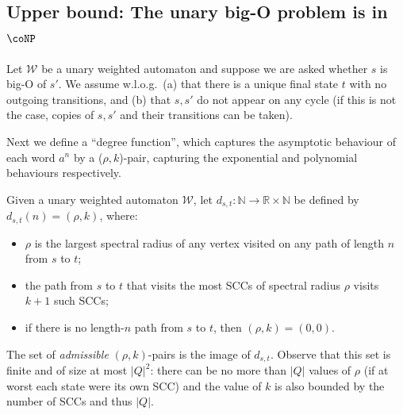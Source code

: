 \documentclass{lmcs}
\theoremstyle{plain}
\theoremstyle{definition}
\theoremstyle{remark}
\newcommand\dgf{d}
\newcommand\wa{\mathcal{W}}
\begin{document}
\subsection{Upper bound: The unary big-O problem is in \texorpdfstring{$\coNP$}{coNP}}
\label{sec:conpsec:upperbound}
Let $\wa$ be a unary weighted automaton and suppose we are asked whether $s$ is big-O of $s'$. We assume  w.l.o.g.\label{conp-ub-assumptions}~(a) that there is a unique final state $t$ with no outgoing transitions, and (b) that $s,s'$ do not appear on any cycle (if this is not the case, copies of $s,s'$ and their transitions can be taken).

Next we define  a ``degree function'', which captures the asymptotic behaviour of each word $a^n$ by a ($\rho,k$)-pair, capturing the exponential and polynomial behaviours respectively.

\begin{defi}\label{def:unarydegreefunction}
Given a unary weighted automaton $\wa$, let $\dgf_{s,t} : \mathbb{N} \to \mathbb{R} \times \mathbb{N}$ be defined by $\dgf_{s,t}(n) = (\rho,k)$, where:
\begin{itemize}
  \item $\rho$ is the largest spectral radius of any vertex visited on any path of length $n$ from $s$ to $t$;
  \item the path from $s$ to $t$ that visits the most SCCs of spectral radius $\rho$ visits $k+1$ such SCCs;
  \item if there is no length-$n$ path  from $s$ to $t$, then $(\rho,k){=}(0,0)$.
\end{itemize}
\end{defi}

The set of \textit{admissible} $(\rho,k)$-pairs is the image of $\dgf_{s,t}$. Observe that this set is finite and of size at most $|Q|^2$: there can be no more than $|Q|$ values of $\rho$ (if at worst each state were its own SCC) and the value of $k$  is also bounded by the number of SCCs and thus $|Q|$.
\end{document}
